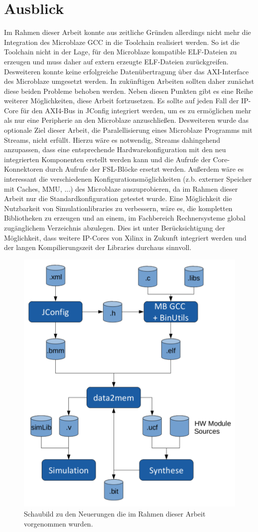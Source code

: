 \section{Ausblick}
Im Rahmen dieser Arbeit konnte aus zeitliche Gründen allerdings nicht mehr die Integration des Microblaze GCC in die Toolchain realisiert werden. So ist die Toolchain nicht in der Lage, für den Microblaze kompatible ELF-Dateien zu erzeugen und muss daher auf extern erzeugte ELF-Dateien zurückgreifen. Desweiteren konnte keine erfolgreiche Datenübertragung über das AXI-Interface des Microblaze umgesetzt werden. In zukünftigen Arbeiten sollten daher zunächst diese beiden Probleme behoben werden. Neben diesen Punkten gibt es eine Reihe weiterer Möglichkeiten, diese Arbeit fortzusetzen. Es sollte auf jeden Fall der IP-Core für den AXI4-Bus in JConfig integriert werden, um es zu ermöglichen mehr als nur eine Peripherie an den Microblaze anzuschließen. Desweiteren wurde das optionale Ziel dieser Arbeit, die Paralellisierung eines Microblaze Programms mit \textmu\/Streams, nicht erfüllt. Hierzu wäre es notwendig, \textmu\/Streams dahingehend anzupassen, dass eine entsprechende Hardwarekonfiguration mit den neu integrierten Komponenten erstellt werden kann und die Aufrufe der Core-Konnektoren durch Aufrufe der FSL-Blöcke ersetzt werden. Außerdem wäre es interessant die verschiedenen Konfigurationsmöglichkeiten (z.b. externer Speicher mit Caches, MMU, ...) des Microblaze auszuprobieren, da im Rahmen dieser Arbeit nur die Standardkonfiguration getestet wurde. Eine Möglichkeit die Nutzbarkeit von Simulationlibraries zu verbessern, wäre es, die kompletten Bibliotheken zu erzeugen und an einem, im Fachbereich Rechnersysteme global zugänglichem Verzeichnis abzulegen. Dies ist unter Berücksichtigung der Möglichkeit, dass weitere IP-Cores von Xilinx in Zukunft integriert werden und der langen Kompilierungszeit der Libraries durchaus sinnvoll.
\begin{figure}
\centering
\includegraphics[width=0.8\linewidth, height=0.8\linewidth]{./bilder/Schaubild}
\caption{Schaubild zu den Neuerungen die im Rahmen dieser Arbeit vorgenommen wurden.}
\label{fig:Schaubild}
\end{figure}